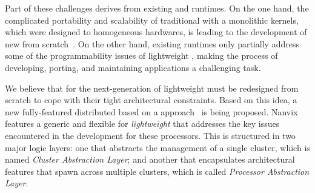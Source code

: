     Part of these challenges derives from existing \oses and runtimes.
    On the one hand, the complicated portability and scalability of traditional \oses with a monolithic kernels, which were designed to homogeneous hardwares, is leading to the development of new \oses from scratch~\cite{Baumann2009, kluge2014, nightingale2009, rhoden2011}.
    On the other hand, existing runtimes only partially address some of the programmability issues of lightweight \manycores, making the process of developing, porting, and maintaining applications a challenging task.




    We believe that \oses for the next-generation of lightweight \manycores must be redesigned from scratch to cope with their tight architectural constraints. Based on this idea, a new fully-featured distributed \os based on a \multikernel approach~\cite{Baumann2009} is being proposed. Nanvix features a generic and flexible \hal for \textit{lightweight} \manycores that addresses the key issues encountered in the development for these processors. This \hal is structured in two major logic layers: one that abstracts the management of a single cluster, which is named \textit{Cluster Abstraction Layer}; and another that encapsulates architectural features that spawn across multiple clusters, which is called \textit{Processor Abstraction Layer}.

